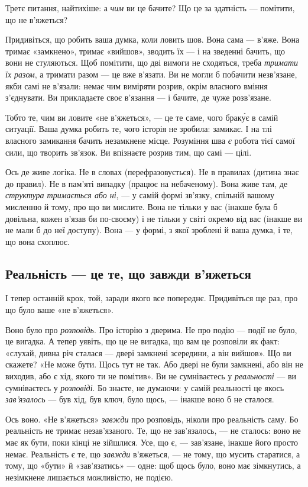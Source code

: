 \documentclass[12pt, a4paper, openany]{book}
\begin{document}
Третє питання, найтихіше: а \emph{чим} ви це бачите? Що це за здатність --- помітити, що не в'яжеться?

Придивіться, що робить ваша думка, коли ловить шов. Вона сама --- в'яже. Вона тримає «замкнено», тримає «вийшов», зводить їх --- і на зведенні бачить, що вони не стуляються. Щоб помітити, що дві вимоги не сходяться, треба \emph{тримати їх разом}, а тримати разом --- це вже в'язати. Ви не могли б побачити незв'язане, якби самі не в'язали: немає чим виміряти розрив, окрім власного вміння з'єднувати. Ви прикладаєте своє в'язання --- і бачите, де чуже розв'язане.

Тобто те, чим ви ловите «не в'яжеться», --- це те саме, чого браку́є в самій ситуації. Ваша думка робить те, чого історія не зробила: замикає. І на тлі власного замикання бачить незамкнене місце. Розуміння шва \emph{є} робота тієї самої сили, що творить зв'язок. Ви впізнаєте розрив тим, що самі --- цілі.

Ось де живе логіка. Не в словах (перефразовується). Не в правилах (дитина знає до правил). Не в пам'яті випадку (працює на небаченому). Вона живе там, де \emph{структура тримається або ні}, --- у самій формі зв'язку, спільній вашому мисленню й тому, про що ви мислите. Вона не тільки у вас (інакше була б довільна, кожен в'язав би по-своєму) і не тільки у світі окремо від вас (інакше ви не мали б до неї доступу). Вона --- у формі, з якої зроблені й ваша думка, і те, що вона схоплює.

\subsection{Реальність --- це те, що завжди в'яжеться}

І тепер останній крок, той, заради якого все попереднє. Придивіться ще раз, про що було ваше «не в'яжеться».

Воно було про \emph{розповідь}. Про історію з дверима. Не про подію --- події не було, це вигадка. А тепер уявіть, що це не вигадка, що вам це розповіли як факт: «слухай, дивна річ сталася --- двері замкнені зсередини, а він вийшов». Що ви скажете? «Не може бути. Щось тут не так. Або двері не були замкнені, або він не виходив, або є хід, якого ти не помітив». Ви не сумніваєтесь у \emph{реальності} --- ви сумніваєтесь у \emph{розповіді}. Бо знаєте, не думаючи: у самій реальності це якось \emph{зав'язалось} --- був хід, був ключ, було щось, --- інакше воно б не сталося.

Ось воно. «Не в'яжеться» \emph{завжди} про розповідь, ніколи про реальність саму. Бо реальність не тримає незав'язаного. Те, що не зав'язалось, --- не сталось: воно не має як бути, поки кінці не зійшлися. Усе, що є, --- зав'язане, інакше його просто немає. Реальність є те, що \emph{завжди} в'яжеться, --- не тому, що мусить старатися, а тому, що «бути» й «зав'язатись» --- одне: щоб щось було, воно має зімкнутись, а незімкнене лишається можливістю, не подією.
\end{document}
